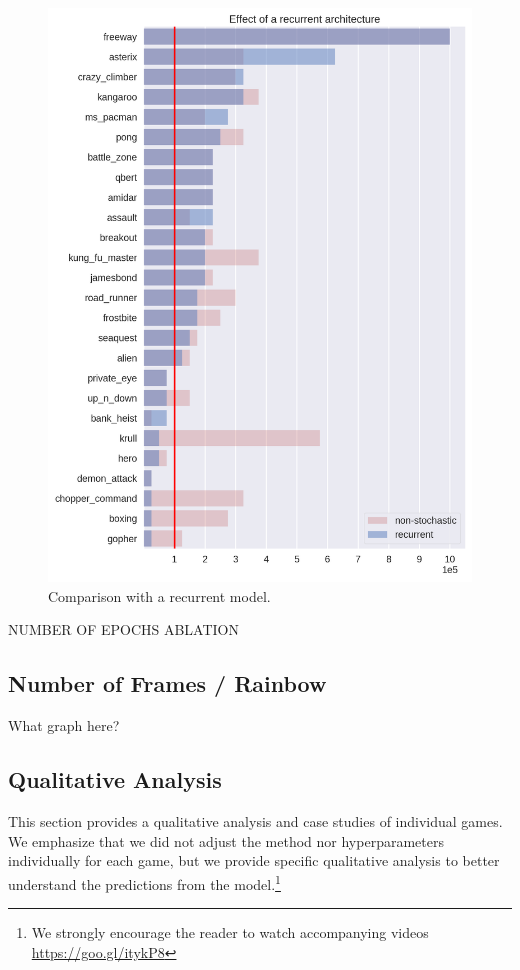 \begin{figure}
\centering
\includegraphics[width=0.9\columnwidth]{figures/eval_recurrent.png}
\caption{Comparison with a recurrent model.}
\label{fig:comp_recurr}
\end{figure}

NUMBER OF EPOCHS ABLATION

\subsection{Number of Frames / Rainbow}\label{qualitative_analysis}

What graph here?


\subsection{Qualitative Analysis}\label{qualitative_analysis}
This section provides a qualitative analysis and case studies of individual games. We emphasize that we did not adjust the method nor hyperparameters individually for each game, but we provide specific qualitative analysis to better understand the predictions from the model.\footnote{We strongly encourage the reader to watch accompanying videos \url{https://goo.gl/itykP8}} 

